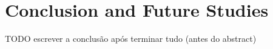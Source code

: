 \chapter{Conclusion and Future Studies}
\label{ch:conclusion}

TODO escrever a conclusão após terminar tudo (antes do abstract)
